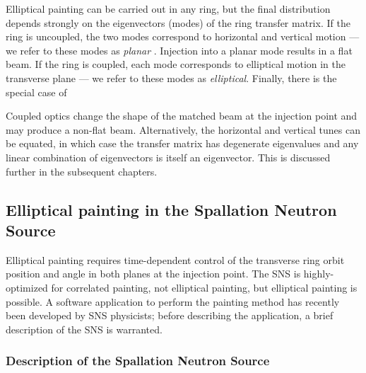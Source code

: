 Elliptical painting can be carried out in any ring, but the final distribution depends strongly on the eigenvectors (modes) of the ring transfer matrix. If the ring is uncoupled, the two modes correspond to horizontal and vertical motion — we refer to these modes as \textit{planar} \cite{Burov2002}. Injection into a planar mode results in a flat beam. If the ring is coupled, each mode corresponds to elliptical motion in the transverse plane — we refer to these modes as \textit{elliptical}. Finally, there is the special case of 

Coupled optics change the shape of the matched beam at the injection point and may produce a non-flat beam. Alternatively, the horizontal and vertical tunes can be equated, in which case the transfer matrix has degenerate eigenvalues and any linear combination of eigenvectors is itself an eigenvector. This is discussed further in the subsequent chapters.


\subsection{Elliptical painting in the Spallation Neutron Source}

Elliptical painting requires time-dependent control of the transverse ring orbit position and angle in both planes at the injection point. The SNS is highly-optimized for correlated painting, not elliptical painting, but elliptical painting is possible. A software application to perform the painting method has recently been developed by SNS physicists; before describing the application, a brief description of the SNS is warranted. 

\subsubsection{Description of the Spallation Neutron Source}

